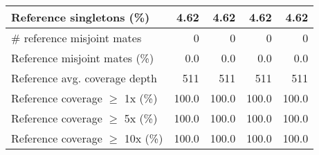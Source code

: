 \documentclass[12pt,a4paper]{article}
\begin{document}
\begin{table}[ht]
\begin{center}
\begin{tabular}{|l*{4}{|r}|}
Reference singletons (\%) & 4.62 & 4.62 & 4.62 & 4.62 \\ \hline
\# reference misjoint mates & 0 & 0 & 0 & 0 \\ \hline
Reference misjoint mates (\%) & 0.0 & 0.0 & 0.0 & 0.0 \\ \hline
Reference avg. coverage depth & 511 & 511 & 511 & 511 \\ \hline
Reference coverage $\geq$ 1x (\%) & 100.0 & 100.0 & 100.0 & 100.0 \\ \hline
Reference coverage $\geq$ 5x (\%) & 100.0 & 100.0 & 100.0 & 100.0 \\ \hline
Reference coverage $\geq$ 10x (\%) & 100.0 & 100.0 & 100.0 & 100.0 \\ \hline
\end{tabular}
\end{center}
\end{table}
\end{document}
